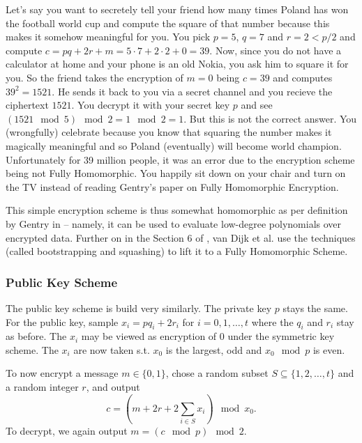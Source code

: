 \begin{example}
	Let's say you want to secretely tell your friend how many times Poland has won the football world cup and compute the square of that number because this makes it somehow meaningful for you. You pick $p=5$, $q=7$ and $r = 2 < p/2$ and compute $c = pq +2r + m = 5 \cdot 7 +2 \cdot 2 +0 = 39$. Now, since you do not have a calculator at home and your phone is an old Nokia, you ask him to square it for you. So the friend takes the encryption of $m = 0$ being $c = 39$ and computes $39^2 = 1521$. He sends it back to you via a secret channel and you recieve the ciphertext $1521$. You decrypt it with your secret key $p$ and see $(1521 \mod 5) \mod 2 = 1 \mod 2 = 1$. But this is not the correct answer. You (wrongfully) celebrate because you know that squaring the number makes it magically meaningful and so Poland (eventually) will become world champion. Unfortunately for 39 million people, it was an error due to the encryption scheme being not Fully Homomorphic. You happily sit down on your chair and turn on the TV instead of reading Gentry's paper on Fully Homomorphic Encryption.
\end{example}

This simple encryption scheme is thus somewhat homomorphic as per definition by Gentry in \cite{gentry_phd} – namely, it can be used to evaluate low-degree polynomials over encrypted data. Further on in the Section 6 of \cite{int_scheme}, van Dijk et al. use the techniques (called bootstrapping and squashing) to lift it to a Fully Homomorphic Scheme.
\subsubsection*{Public Key Scheme}
The public key scheme is build very similarly. The private key $p$ stays the same. For the public key, sample $x_i = p q_i + 2r_i$ for $i = 0, 1, \dots, t$ where the $q_i$ and $r_i$ stay as before. The $x_i$ may be viewed as encryption of 0 under the symmetric key scheme. The $x_i$ are now taken s.t. $x_0$ is the largest, odd and $x_0 \mod p$ is even.

To now encrypt a message $m \in \{0,1\}$, chose a random subset $S \subseteq \{1, 2, \dots, t\}$ and a random integer $r$, and output
\begin{equation} c = (m + 2r + 2\sum_{i \in S} x_i) \mod x_0.\end{equation}
To decrypt, we again output $m = (c \mod p) \mod 2$.

